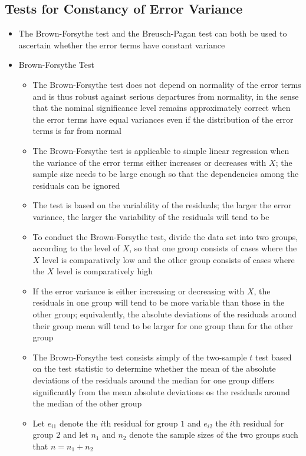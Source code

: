 \subsection{Tests for Constancy of Error Variance}
\begin{itemize}
\item The Brown-Forsythe test and the Breusch-Pagan test can both be used to ascertain whether the error terms have constant variance
\item Brown-Forsythe Test \begin{itemize} 
\item The Brown-Forsythe test does not depend on normality of the error terms and is thus robust against serious departures from normality, in the sense that the nominal significance level remains approximately correct when the error terms have equal variances even if the distribution of the error terms is far from normal
\item The Brown-Forsythe test is applicable to simple linear regression when the variance of the error terms either increases or decreases with $X$; the sample size needs to be large enough so that the dependencies among the residuals can be ignored 
\item The test is based on the variability of the residuals; the larger the error variance, the larger the variability of the residuals will tend to be 
\item To conduct the Brown-Forsythe test, divide the data set into two groups, according to the level of $X$, so that one group consists of cases where the $X$ level is comparatively low and the other group consists of cases where the $X$ level is comparatively high
\item If the error variance is either increasing or decreasing with $X$, the residuals in one group will tend to be more variable than those in the other group; equivalently, the absolute deviations of the residuals around their group mean will tend to be larger for one group than for the other group
\item The Brown-Forsythe test consists simply of the two-sample $t$ test based on the test statistic to determine whether the mean of the absolute deviations of the residuals around the median for one group differs significantly from the mean absolute deviations os the residuals around the median of the other group 
\item Let $e_{i1}$ denote the $i$th residual for group $1$ and $e_{i2}$ the $i$th residual for group $2$ and let $n_1$ and $n_2$ denote the sample sizes of the two groups such that $n = n_1 + n_2$

\end{itemize}
\end{itemize}
